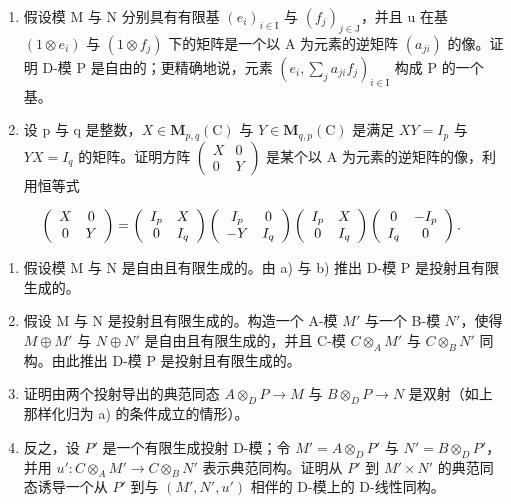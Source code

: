 \begin{enumerate}
\def\labelenumi{\alph{enumi})}
\item
  假设模 M 与 N 分别具有有限基 \((e_{i})_{i\in\mathrm{I}}\) 与 \((f_{j})_{j\in\mathrm{J}}\)，并且 u 在基 \((1\otimes e_{i})\) 与 \((1\otimes f_{j})\) 下的矩阵是一个以 A 为元素的逆矩阵 \((a_{ji})\) 的像。证明 D-模 P 是自由的；更精确地说，元素 \((e_{i},\sum_{j}a_{ji}f_{j})_{i\in\mathrm{I}}\) 构成 P 的一个基。
\item
  设 p 与 q 是整数，\(X \in \mathbf{M}_{p,q}(\mathrm{C})\) 与 \(Y \in \mathbf{M}_{q,p}(\mathrm{C})\) 是满足 \(XY = I_{p}\) 与 \(YX = I_{q}\) 的矩阵。证明方阵 \(\begin{pmatrix} X & 0 \\ 0 & Y \end{pmatrix}\) 是某个以 A 为元素的逆矩阵的像，利用恒等式
\end{enumerate}

\[
\left( \begin{array}{c c} X & 0 \\ 0 & Y \end{array} \right) = \left( \begin{array}{c c} I _ {p} & X \\ 0 & I _ {q} \end{array} \right) \left( \begin{array}{c c} I _ {p} & 0 \\ - Y & I _ {q} \end{array} \right) \left( \begin{array}{c c} I _ {p} & X \\ 0 & I _ {q} \end{array} \right) \left( \begin{array}{c c} 0 & - I _ {p} \\ I _ {q} & 0 \end{array} \right).
\]

\begin{enumerate}
\def\labelenumi{\alph{enumi})}
\setcounter{enumi}{2}
\item
  假设模 M 与 N 是自由且有限生成的。由 a) 与 b) 推出 D-模 P 是投射且有限生成的。
\item
  假设 M 与 N 是投射且有限生成的。构造一个 A-模 \(M'\) 与一个 B-模 \(N'\)，使得 \(M \oplus M'\) 与 \(N \oplus N'\) 是自由且有限生成的，并且 C-模 \(C \otimes_{A} M'\) 与 \(C \otimes_{B} N'\) 同构。由此推出 D-模 P 是投射且有限生成的。
\item
  证明由两个投射导出的典范同态 \(A \otimes_{D} P \to M\) 与 \(B \otimes_{D} P \to N\) 是双射（如上那样化归为 a) 的条件成立的情形）。
\item
  反之，设 \(P'\) 是一个有限生成投射 D-模；令 \(M' = A \otimes_{D} P'\) 与 \(N' = B \otimes_{D} P'\)，并用 \(u' : C \otimes_{A} M' \to C \otimes_{B} N'\) 表示典范同构。证明从 \(P'\) 到 \(M' \times N'\) 的典范同态诱导一个从 \(P'\) 到与 \((M', N', u')\) 相伴的 D-模上的 D-线性同构。
\end{enumerate}

